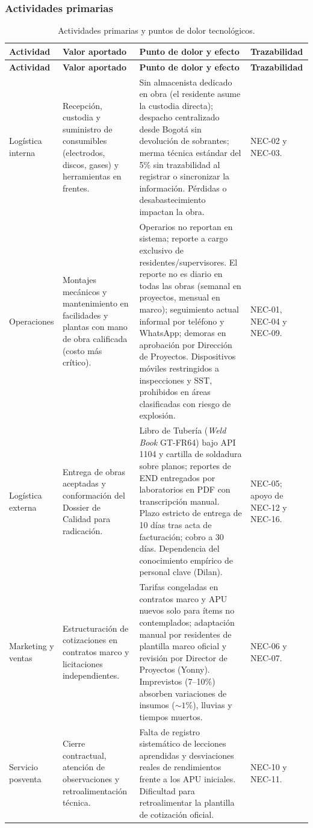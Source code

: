 \documentclass[12pt,letterpaper]{article}
\begin{document}
\subsubsection{Actividades primarias}
{\small
\renewcommand{\arraystretch}{1.15}
\begin{longtable}{@{}L{2.6cm}L{3.5cm}L{5.2cm}L{3.1cm}@{}}
\caption{Actividades primarias y puntos de dolor tecnológicos.}\label{tab:cadena-primarias}\\
\toprule{}
\textbf{Actividad} & \textbf{Valor aportado} & \textbf{Punto de dolor y efecto} & \textbf{Trazabilidad}\\
\midrule\endfirsthead
\toprule{}\textbf{Actividad} & \textbf{Valor aportado} & \textbf{Punto de dolor y efecto} & \textbf{Trazabilidad}\\\midrule\endhead
\bottomrule\endfoot
Logística interna & Recepción, custodia y suministro de consumibles (electrodos, discos, gases) y herramientas en frentes. & Sin almacenista dedicado en obra (el residente asume la custodia directa); despacho centralizado desde Bogotá sin devolución de sobrantes; merma técnica estándar del 5\% sin trazabilidad al registrar o sincronizar la información. Pérdidas o desabastecimiento impactan la obra. & NEC-02 y NEC-03.\\\addlinespace
Operaciones & Montajes mecánicos y mantenimiento en facilidades y plantas con mano de obra calificada (costo más crítico). & Operarios no reportan en sistema; reporte a cargo exclusivo de residentes/supervisores. El reporte no es diario en todas las obras (semanal en proyectos, mensual en marco); seguimiento actual informal por teléfono y WhatsApp; demoras en aprobación por Dirección de Proyectos. Dispositivos móviles restringidos a inspecciones y SST, prohibidos en áreas clasificadas con riesgo de explosión. & NEC-01, NEC-04 y NEC-09.\\\addlinespace
Logística externa & Entrega de obras aceptadas y conformación del Dossier de Calidad para radicación. & Libro de Tubería (\emph{Weld Book} GT-FR64) bajo API 1104 y cartilla de soldadura sobre planos; reportes de END entregados por laboratorios en PDF con transcripción manual. Plazo estricto de entrega de 10 días tras acta de facturación; cobro a 30 días. Dependencia del conocimiento empírico de personal clave (Dilan). & NEC-05; apoyo de NEC-12 y NEC-16.\\\addlinespace
Marketing y ventas & Estructuración de cotizaciones en contratos marco y licitaciones independientes. & Tarifas congeladas en contratos marco y APU nuevos solo para ítems no contemplados; adaptación manual por residentes de plantilla marco oficial y revisión por Director de Proyectos (Yonny). Imprevistos (7--10\%) absorben variaciones de insumos ($\sim 1\%$), lluvias y tiempos muertos. & NEC-06 y NEC-07.\\\addlinespace
Servicio posventa & Cierre contractual, atención de observaciones y retroalimentación técnica. & Falta de registro sistemático de lecciones aprendidas y desviaciones reales de rendimientos frente a los APU iniciales. Dificultad para retroalimentar la plantilla de cotización oficial. & NEC-10 y NEC-11.\\
\end{longtable}}
\end{document}
